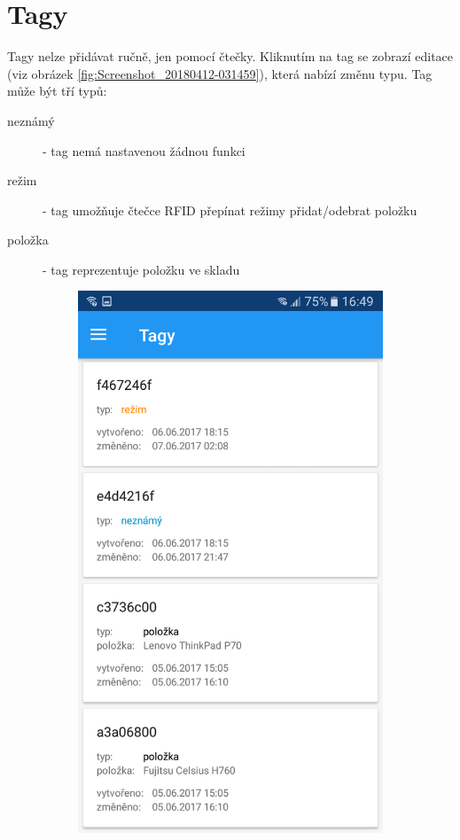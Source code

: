 \documentclass[12pt]{report}
\begin{document}
\section{Tagy}
Tagy nelze přidávat ručně, jen pomocí čtečky. Kliknutím na tag se zobrazí editace (viz obrázek \ref{fig:Screenshot_20180412-031459}), která nabízí změnu typu. Tag může být tří typů:
\begin{description}
\item [neznámý] - tag nemá nastavenou žádnou funkci
\item [režim] - tag umožňuje čtečce RFID přepínat režimy přidat/odebrat položku
\item [položka] - tag reprezentuje položku ve skladu 
\end{description}
\begin{figure}[H]
	\centering
  \begin{subfigure}[b]{0.3\textwidth}
    \centering
	\includegraphics[width=\textwidth]{../images/client_android/Screenshot_20170607-164958.png}	

\end{subfigure}
\end{figure}
\end{document}
